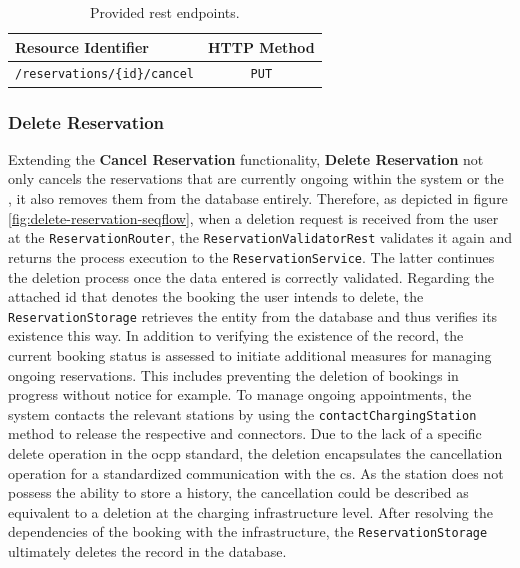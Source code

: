 \begingroup
\setlength{\tabcolsep}{10pt} %
\renewcommand{\arraystretch}{1.5} %
\begin{table}[h]
\centering
\caption{Provided \acrshort{rest} endpoints.}
    \begin{tabular}{l|c}
    Resource Identifier & HTTP Method \\ \hline
    \texttt{/reservations/\{id\}/cancel} & \texttt{PUT}
    \end{tabular}
\label{tab:cancel-reservation-rest}
\end{table}
\endgroup

\newpage

\subsubsection{Delete Reservation}
\label{ch:Implementation:sec:Reservation System:ssec:Management Capabilities:sssec:Delete Reservation}

Extending the \textbf{Cancel Reservation} functionality, \textbf{Delete Reservation} not only cancels the reservations that are currently ongoing within the system or the , it also removes them from the database entirely.
Therefore, as depicted in figure \ref{fig:delete-reservation-seqflow}, when a deletion request is received from the user at the \texttt{ReservationRouter}, the \texttt{ReservationValidatorRest} validates it again and returns the process execution to the \texttt{ReservationService}. The latter continues the deletion process once the data entered is correctly validated.
Regarding the attached \acrshort{id} that denotes the booking the user intends to delete, the \texttt{ReservationStorage} retrieves the entity from the database and thus verifies its existence this way.
In addition to verifying the existence of the record, the current booking status is assessed to initiate additional measures for managing ongoing reservations.
This includes preventing the deletion of bookings in progress without notice for example. To manage ongoing appointments, the system contacts the relevant stations by using the \texttt{contactChargingStation} method to release the respective  and connectors.
Due to the lack of a specific delete operation in the \acrshort{ocpp} standard, the deletion encapsulates the cancellation operation for a standardized communication with the \acrshort{cs}. As the station does not possess the ability to store a history, the cancellation could be described as equivalent to a deletion at the charging infrastructure level.
After resolving the dependencies of the booking with the infrastructure, the \texttt{ReservationStorage} ultimately deletes the record in the database.

